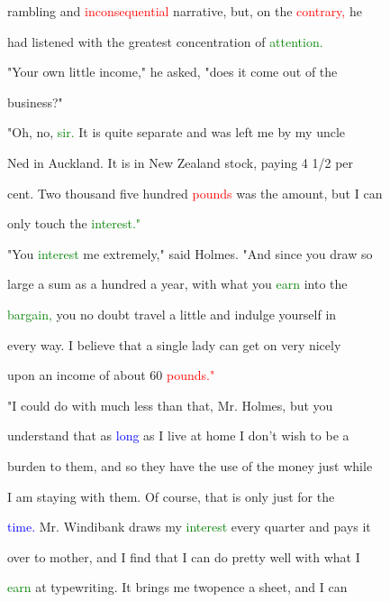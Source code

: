  rambling and \textcolor{red}{inconsequential} narrative, but, on the \textcolor{red}{contrary,} he

 had listened with the greatest concentration of \textcolor{green}{attention.}



 "Your own little \textcolor{BurntOrange}{income,"} he asked, "does it come out of the

 business?"



 "Oh, no, \textcolor{green}{sir.} It is quite separate and was left me by my uncle

 Ned in Auckland. It is in New Zealand stock, \textcolor{BurntOrange}{paying} 4 1/2 per

 cent. Two thousand five hundred \textcolor{red}{pounds} was the amount, but I can

 only touch the \textcolor{green}{interest."}



 "You \textcolor{green}{interest} me extremely," said Holmes. "And since you draw so

 large a sum as a hundred a year, with what you \textcolor{green}{earn} into the

 \textcolor{green}{bargain,} you no \textcolor{BurntOrange}{doubt} travel a little and indulge yourself in

 every way. I believe that a single lady can get on very nicely

 upon an \textcolor{BurntOrange}{income} of about 60 \textcolor{red}{pounds."}



 "I could do with much less than that, Mr. Holmes, but you

 understand that as \textcolor{blue}{long} as I live at home I don't wish to be a

 burden to them, and so they have the use of the \textcolor{BurntOrange}{money} just while

 I am staying with them. Of course, that is only just for the

 \textcolor{blue}{time.} Mr. Windibank draws my \textcolor{green}{interest} every quarter and \textcolor{BurntOrange}{pays} it

 over to \textcolor{BurntOrange}{mother,} and I find that I can do \textcolor{BurntOrange}{pretty} well with what I

 \textcolor{green}{earn} at typewriting. It brings me twopence a sheet, and I can

